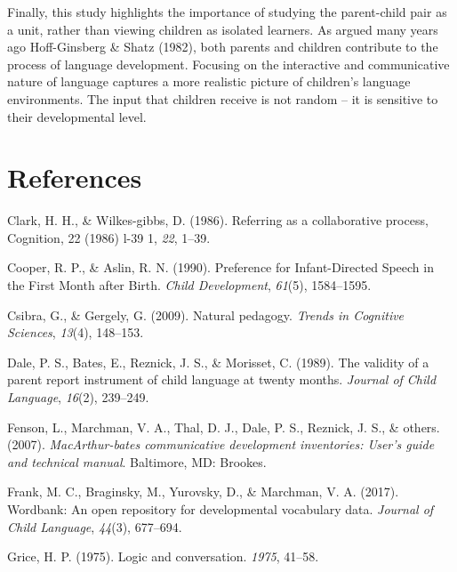 \documentclass[10pt, letterpaper]{article}
\begin{document}
Finally, this study highlights the importance of studying the
parent-child pair as a unit, rather than viewing children as isolated
learners. As argued many years ago Hoff-Ginsberg \& Shatz (1982), both
parents and children contribute to the process of language development.
Focusing on the interactive and communicative nature of language
captures a more realistic picture of children's language environments.
The input that children receive is not random -- it is sensitive to
their developmental level.

\hypertarget{references}{%
\section{References}\label{references}}

\setlength{\parindent}{-0.1in} 
\setlength{\leftskip}{0.125in}

\noindent

\hypertarget{refs}{}
\leavevmode\hypertarget{ref-clark1986}{}%
Clark, H. H., \& Wilkes-gibbs, D. (1986). Referring as a collaborative
process, Cognition, 22 (1986) l-39 1, \emph{22}, 1--39.

\leavevmode\hypertarget{ref-cooper1990}{}%
Cooper, R. P., \& Aslin, R. N. (1990). Preference for Infant-Directed
Speech in the First Month after Birth. \emph{Child Development},
\emph{61}(5), 1584--1595.

\leavevmode\hypertarget{ref-csibra2009}{}%
Csibra, G., \& Gergely, G. (2009). Natural pedagogy. \emph{Trends in
Cognitive Sciences}, \emph{13}(4), 148--153.

\leavevmode\hypertarget{ref-dale1989}{}%
Dale, P. S., Bates, E., Reznick, J. S., \& Morisset, C. (1989). The
validity of a parent report instrument of child language at twenty
months. \emph{Journal of Child Language}, \emph{16}(2), 239--249.

\leavevmode\hypertarget{ref-fenson2007}{}%
Fenson, L., Marchman, V. A., Thal, D. J., Dale, P. S., Reznick, J. S.,
\& others. (2007). \emph{MacArthur-bates communicative development
inventories: User's guide and technical manual}. Baltimore, MD: Brookes.

\leavevmode\hypertarget{ref-frank2017}{}%
Frank, M. C., Braginsky, M., Yurovsky, D., \& Marchman, V. A. (2017).
Wordbank: An open repository for developmental vocabulary data.
\emph{Journal of Child Language}, \emph{44}(3), 677--694.

\leavevmode\hypertarget{ref-grice1975}{}%
Grice, H. P. (1975). Logic and conversation. \emph{1975}, 41--58.
\end{document}
